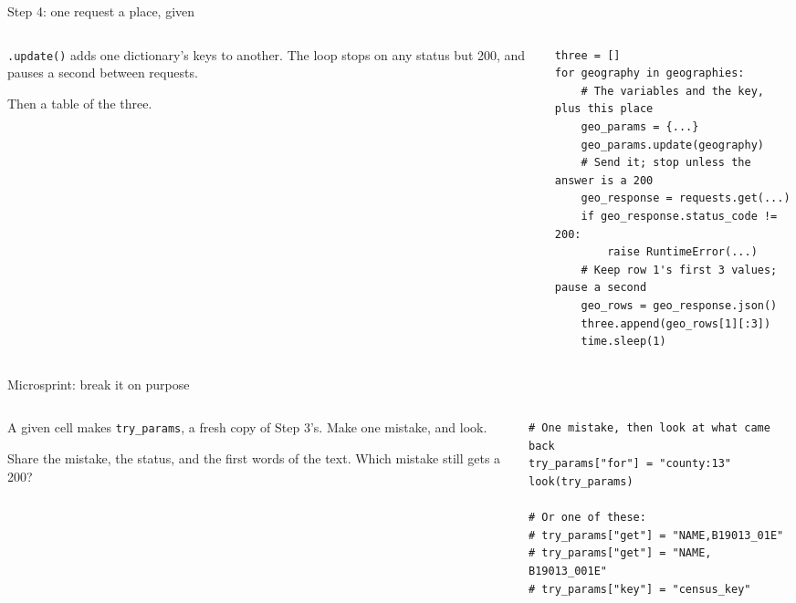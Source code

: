 \documentclass[9pt,aspectratio=169]{beamer}
\begin{document}
\begin{frame}[fragile]{Step 4: one request a place, given}
    \begin{columns}[T]
        \begin{column}{0.37\textwidth}
            \texttt{.update()} adds one dictionary's keys to another. The loop stops on any status but 200, and pauses a second between requests.

            \medskip
            Then a table of the three.
        \end{column}
        \begin{column}{0.6\textwidth}
\begin{lstlisting}
three = []
for geography in geographies:
    # The variables and the key, plus this place
    geo_params = {...}
    geo_params.update(geography)
    # Send it; stop unless the answer is a 200
    geo_response = requests.get(...)
    if geo_response.status_code != 200:
        raise RuntimeError(...)
    # Keep row 1's first 3 values; pause a second
    geo_rows = geo_response.json()
    three.append(geo_rows[1][:3])
    time.sleep(1)
\end{lstlisting}
        \end{column}
    \end{columns}
\end{frame}

\begin{frame}[fragile]{Microsprint: break it on purpose}
    \begin{columns}[T]
        \begin{column}{0.37\textwidth}
            A given cell makes \texttt{try\_params}, a fresh copy of Step 3's. Make one mistake, and look.

            \medskip
            Share the mistake, the status, and the first words of the text. Which mistake still gets a 200?
        \end{column}
        \begin{column}{0.6\textwidth}
\begin{lstlisting}
# One mistake, then look at what came back
try_params["for"] = "county:13"
look(try_params)

# Or one of these:
# try_params["get"] = "NAME,B19013_01E"
# try_params["get"] = "NAME, B19013_001E"
# try_params["key"] = "census_key"
\end{lstlisting}
        \end{column}
    \end{columns}
\end{frame}
\end{document}
